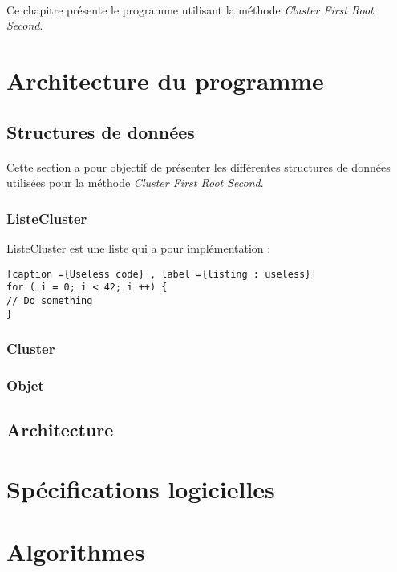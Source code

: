 \documentclass[twoside,UTF8]{EPURapport}
\begin{document}
\paragraph{} Ce chapitre présente le programme utilisant la méthode \textit{Cluster First Root Second}. 

\section{Architecture du programme}
\subsection{Structures de données}
\paragraph{} Cette section a pour objectif de présenter les différentes structures de données utilisées pour la méthode \textit{Cluster First Root Second}.

\subsubsection{ListeCluster}

ListeCluster est une liste qui a pour implémentation : 
\begin{lstlisting}[caption ={Useless code} , label ={listing : useless}]
for ( i = 0; i < 42; i ++) {
// Do something
}
\end{lstlisting}

\subsubsection{Cluster}

\subsubsection{Objet}

\subsection{Architecture}

\section{Spécifications logicielles}


\section{Algorithmes}
\end{document}
